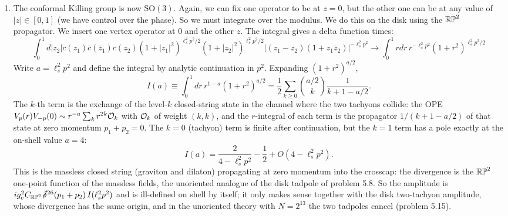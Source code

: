 \documentclass[11pt, class=article, crop=false]{standalone}
\begin{document}
\begin{enumerate}
	\item The conformal Killing group is now $\mathrm{SO}(3)$. Again, we can fix one operator to be at $z = 0$, but the other one can be at any value of $|z| \in [0, 1]$ (we have control over the phase). So we must integrate over the modulus. We do this on the disk using the $\mathbb{RP}^2$ propagator. We insert one vertex operator at $0$ and the other $z$. The integral gives a delta function times: 
	\[
		\int_0^1 d|z_2| c(z_1)\bar c(\bar z_1) c(z_2)  (1+|z_1|^2)^{\ell_s^2 p^2/2} (1+|z_2|^2)^{\ell_s^2 p^2/2} |(z_1 - z_2) (1+z_1 \bar z_2)|^{-\ell_s^2 p^2}\to \int_0^1 r dr\, r^{-\ell_s^2 p^2} (1+r^2)^{\ell_s^2 p^2/2}
	\]
	Write $a = \ell_s^2 p^2$ and define the integral by analytic continuation in $p^2$. Expanding $(1+r^2)^{a/2}$,
	\[
		I(a) \equiv \int_0^1 dr\, r^{1-a} (1+r^2)^{a/2} = \frac12 \sum_{k \geq 0} \binom{a/2}{k} \frac{1}{k + 1 - a/2}.
	\]
	The $k$-th term is the exchange of the level-$k$ closed-string state in the channel where the two tachyons collide: the OPE $V_p(r) V_{-p}(0) \sim r^{-a} \sum_k r^{2k} \mathcal{O}_k$ with $\mathcal{O}_k$ of weight $(k, k)$, and the $r$-integral of each term is the propagator $1/(k+1-a/2)$ of that state at zero momentum $p_1 + p_2 = 0$. The $k = 0$ (tachyon) term is finite after continuation, but the $k = 1$ term has a pole exactly at the on-shell value $a = 4$:
	\[
		I(a) = \frac{2}{4 - \ell_s^2 p^2} - \frac12 + O(4 - \ell_s^2 p^2).
	\]
	This is the massless closed string (graviton and dilaton) propagating at zero momentum into the crosscap: the divergence is the $\mathbb{RP}^2$ one-point function of the massless fields, the unoriented analogue of the disk tadpole of problem 5.8. So the amplitude is $i g_c^2 C_{\mathbb{RP}^2}\, \cancel\delta^{26}(p_1 + p_2)\, I(\ell_s^2 p^2)$ and is ill-defined on shell by itself; it only makes sense together with the disk two-tachyon amplitude, whose divergence has the same origin, and in the unoriented theory with $N = 2^{13}$ the two tadpoles cancel (problem 5.15).
	

\end{enumerate}
\end{document}
